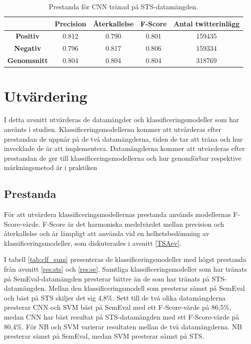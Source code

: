 \documentclass{kaumasters} %
\begin{document}
\begin{table}[H]
\centering
\caption{Prestanda för CNN tränad på STS-datamängden.}
\label{tab:cnn_sts}
    \begin{tabular}{ccccc}
    \toprule
     & \textbf{Precision} & \textbf{Återkallelse} & \textbf{F-Score} & \textbf{Antal twitterinlägg}  \\
    \midrule
    \textbf{Positiv} & 0.812 & 0.790 & 0.801 & 159435 \\
    \textbf{Negativ} & 0.796 & 0.817 & 0.806 & 159334 \\
    \midrule
    \textbf{Genomsnitt} & 0.804 & 0.804 & 0.804  & 318769 \\
    \bottomrule
\end{tabular}
\end{table}

\section{Utvärdering}\label{res:utv}
I detta avsnitt utvärderas de datamängder och klassificeringsmodeller som har använts i studien. Klassificeringsmodellerna kommer att utvärderas efter prestandan de uppnår på de två datamängderna, tiden de tar att träna och hur invecklade de är att implementera. Datamängderna kommer att utvärderas efter prestandan de ger till klassificeringsmodellerna och hur genomförbar respektive märkningsmetod är i praktiken

\subsection{Prestanda}\label{res:pres}
För att utvärdera klassificeringsmodellernas prestanda används modellernas F-Score-värde. F-Score är det harmoniska medelvärdet mellan precision och återkallelse och är lämpligt att använda vid en helhetsbedömning av klassificeringsmodeller, som diskuterades i avsnitt \ref{TSAev}. 

I tabell \ref{tab:clf_sum} presenteras de klassificeringsmodeller med högst prestanda från avsnitt \ref{res:sts} och \ref{res:se}. Samtliga klassificeringsmodeller som har tränats på SemEval-datamängden presterar bättre än de som har tränats på STS-datamängden. Mellan den klassificeringsmodell som presterar sämst på SemEval och bäst på STS skiljer det sig 4,8\%. Sett till de två olika datamängderna presterar CNN och SVM bäst på SemEval med ett F-Score-värde på 86,5\%, medan CNN har bäst resultat på STS-datamängden med ett F-Score-värde på 80,4\%. För NB och SVM varierar resultaten mellan de två datamängderna. NB presterar sämst på SemEval, medan SVM presterar sämst på STS.
\end{document}
